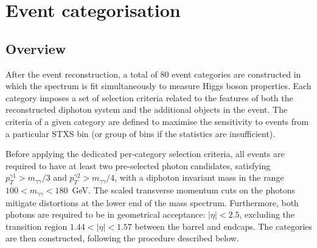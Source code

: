 \section{Event categorisation}\label{sec:event_categorisation}

\subsection{Overview}
After the event reconstruction, a total of 80 event categories are constructed in which the \mgg spectrum is fit simultaneously to measure Higgs boson properties. Each category imposes a set of selection criteria related to the features of both the reconstructed diphoton system and the additional objects in the event. The criteria of a given category are defined to maximise the sensitivity to events from a particular STXS bin (or group of bins if the statistics are insufficient).

Before applying the dedicated per-category selection criteria, all events are required to have at least two pre-selected photon candidates, satisfying $p_T^{\gamma 1}>m_{\gamma\gamma}/3$ and $p_T^{\gamma 2}>m_{\gamma\gamma}/4$, with a diphoton invariant mass in the range $100<m_{\gamma\gamma}<180$~GeV. The scaled transverse momentum cuts on the photons mitigate distortions at the lower end of the mass spectrum. Furthermore, both photons are required to be in geometrical acceptance: $|\eta|<2.5$, excluding the transition region $1.44<|\eta|<1.57$ between the barrel and endcaps. The categories are then constructed, following the procedure described below.

